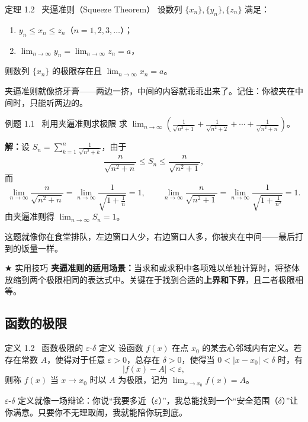 \documentclass[12pt,a4paper]{article}
\newcommand{\purpletext}[1]{{\color{Royal}\textbf{#1}}}
\newcommand{\humor}[1]{\par\smallskip\begin{humorbox}#1\end{humorbox}\smallskip}
\begin{document}
\begin{thmbox}{定理 1.2 \ 夹逼准则（Squeeze Theorem）}
设数列 $\{x_n\}, \{y_n\}, \{z_n\}$ 满足：
\begin{enumerate}[leftmargin=2em, itemsep=2pt]
  \item $y_n \leqslant x_n \leqslant z_n$（$n = 1, 2, 3, \ldots$）；
  \item $\displaystyle\lim_{n \to \infty} y_n = \lim_{n \to \infty} z_n = a$，
\end{enumerate}
则数列 $\{x_n\}$ 的极限存在且 $\displaystyle\lim_{n \to \infty} x_n = a$。
\end{thmbox}
\humor{夹逼准则就像挤牙膏——两边一挤，中间的内容就乖乖出来了。记住：你被夹在中间时，只能听两边的。}

\begin{exbox}{例题 1.1 \ 利用夹逼准则求极限}
求 $\displaystyle\lim_{n \to \infty} \left(\frac{1}{\sqrt{n^2+1}} + \frac{1}{\sqrt{n^2+2}} + \cdots + \frac{1}{\sqrt{n^2+n}}\right)$。

\sffamily\textbf{解：}\normalfont 设 $S_n = \sum_{k=1}^{n} \frac{1}{\sqrt{n^2+k}}$，由于
\[
\frac{n}{\sqrt{n^2+n}} \leqslant S_n \leqslant \frac{n}{\sqrt{n^2+1}},
\]
而
\[
\lim_{n \to \infty} \frac{n}{\sqrt{n^2+n}} = \lim_{n \to \infty} \frac{1}{\sqrt{1+\frac{1}{n}}} = 1, \qquad
\lim_{n \to \infty} \frac{n}{\sqrt{n^2+1}} = \lim_{n \to \infty} \frac{1}{\sqrt{1+\frac{1}{n^2}}} = 1.
\]
由夹逼准则得 $\displaystyle\lim_{n \to \infty} S_n = \boxed{1}$。
\end{exbox}
\humor{这题就像你在食堂排队，左边窗口人少，右边窗口人多，你被夹在中间——最后打到的饭量一样。}

\begin{tipbox}{$\bigstar$ 实用技巧}
\textbf{夹逼准则的适用场景：}当求和或求积中各项难以单独计算时，将整体放缩到两个极限相同的表达式中。关键在于找到合适的\purpletext{上界和下界}，且二者极限相等。
\end{tipbox}

\subsection{函数的极限}

\begin{defbox}{定义 1.2 \ 函数极限的 $\varepsilon$-$\delta$ 定义}
设函数 $f(x)$ 在点 $x_0$ 的某去心邻域内有定义。若存在常数 $A$，使得对于任意 $\varepsilon > 0$，总存在 $\delta > 0$，使得当 $0 < |x - x_0| < \delta$ 时，有
\[
|f(x) - A| < \varepsilon,
\]
则称 $f(x)$ 当 $x \to x_0$ 时以 $A$ 为极限，记为 $\displaystyle\lim_{x \to x_0} f(x) = A$。
\end{defbox}
\humor{$\varepsilon$-$\delta$ 定义就像一场辩论：你说“我要多近（$\varepsilon$）”，我总能找到一个“安全范围（$\delta$）”让你满意。只要你不无理取闹，我就能陪你玩到底。}
\end{document}
